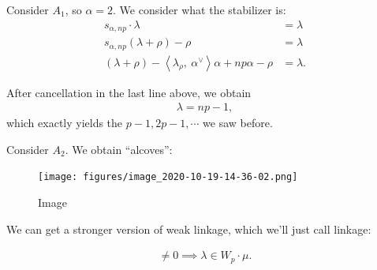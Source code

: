 \begin{example}

\begin{example}

Consider \(A_1\), so \(\alpha = 2\). We consider what the stabilizer is:
\begin{align*}   s_{\alpha, np}\cdot \lambda &= \lambda \\ s_{\alpha, np}(\lambda + \rho) - \rho &= \lambda \\ (\lambda + \rho) - {\left\langle {\lambda _ \rho},~{\alpha^\vee} \right\rangle}\alpha + np\alpha - \rho &= \lambda .\end{align*}

After cancellation in the last line above, we obtain
\begin{align*}   \lambda = np-1 ,\end{align*} which exactly yields the
\(p-1, 2p-1, \cdots\) we saw before.

\end{example}

\end{example}

\begin{example}

\begin{example}

Consider \(A_2\). We obtain ``alcoves'':

\begin{figure}
\centering
\texttt{[image: figures/image\_2020-10-19-14-36-02.png]}
\caption{Image}
\end{figure}

\end{example}

\end{example}

We can get a stronger version of weak linkage, which we'll just call
linkage:

\begin{theorem}[Linkage]

\begin{theorem}[Linkage]

\begin{align*}   [H^0(\lambda): L(\mu)] \neq 0 \implies \lambda \in W_p \cdot \mu .\end{align*}

\end{theorem}

\end{theorem}

